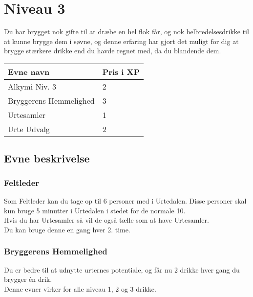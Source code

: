 \chapter{Niveau 3}
Du har brygget nok gifte til at dræbe en hel flok får, og nok helbredelsesdrikke til at kunne brygge dem i søvne, og denne erfaring har gjort det muligt for dig at brygge stærkere drikke end du havde regnet med, da du blandende dem.

\begin{table}[H]
    \centering
    \begin{tabular}{|p{}|p{}|}
    \rowcolor{cerulean!80}\hline
        Evne navn & Pris i XP \\\hline
        Alkymi Niv. 3 & 2\\\hline
        Bryggerens Hemmelighed & 3\\\hline
        Urtesamler & 1 \\\hline
        Urte Udvalg & 2\\
         \hline
    \end{tabular}
\end{table}
\section*{Evne beskrivelse}




\subsection{Feltleder}
Som Feltleder kan du tage op til 6 personer med i Urtedalen. Disse personer skal kun bruge 5 minutter i Urtedalen i stedet for de normale 10. \\
Hvis du har Urtesamler så vil de også tælle som at have Urtesamler.\\
Du kan bruge denne en gang hver 2. time.


\subsection{Bryggerens Hemmelighed}
Du er bedre til at udnytte urternes potentiale, og får nu 2 drikke hver gang du brygger én drik.\\
Denne evner virker for alle niveau 1, 2 og 3 drikke.\\



